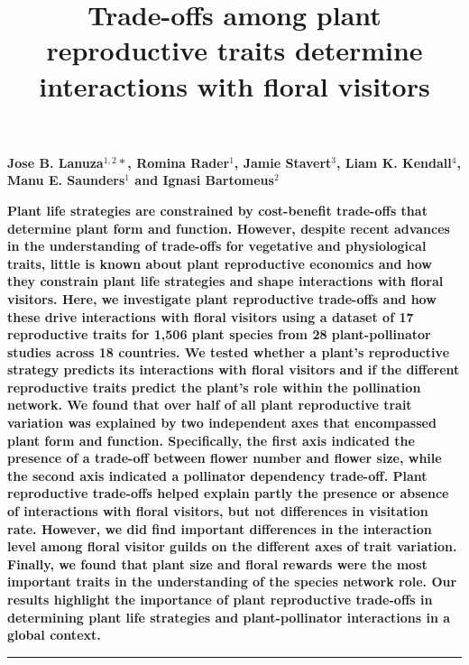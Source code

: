 \documentclass[
  12pt,
  a4paper,
]{article}
\title{\singlespacing \vspace{-1.6cm} \LARGE Trade-offs among plant reproductive traits determine interactions with floral visitors}
\author{}
\date{\vspace{-2.5em}}
\begin{document}
\maketitle

\vspace{-1.7cm}
\singlespacing
\large

\textbf{Jose B. Lanuza$^{1,2}*$, Romina Rader$^{1}$, Jamie Stavert$^{3}$, Liam K. Kendall$^{4}$, Manu E. Saunders$^{1}$ and Ignasi Bartomeus$^{2}$}

\vspace{0.3cm}

\normalsize

\textbf{Plant life strategies are constrained by cost-benefit trade-offs that determine plant form and function. However, despite recent advances in the understanding of trade-offs for vegetative and physiological traits, little is known about plant reproductive economics and how they constrain plant life strategies and shape interactions with floral visitors. Here, we investigate plant reproductive trade-offs and how these drive interactions with floral visitors using a dataset of 17 reproductive traits for 1,506 plant species from 28 plant-pollinator studies across 18 countries. We tested whether a plant's reproductive strategy predicts its interactions with floral visitors and if the different reproductive traits predict the plant's role within the pollination network. We found that over half of all plant reproductive trait variation was explained by two independent axes that encompassed plant form and function. Specifically, the first axis indicated the presence of a trade-off between flower number and flower size, while the second axis indicated a pollinator dependency trade-off. Plant reproductive trade-offs helped explain partly the presence or absence of interactions with floral visitors, but not differences in visitation rate. However, we did find important differences in the interaction level among floral visitor guilds on the different axes of trait variation. Finally, we found that plant size and floral rewards were the most important traits in the understanding of the species network role. Our results highlight the importance of plant reproductive trade-offs in determining plant life strategies and plant-pollinator interactions in a global context.}

\small
\vspace{-0.5cm}

\noindent

\rule{\textwidth}{1pt}
\end{document}
